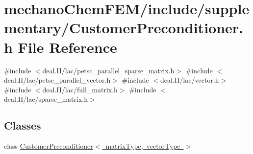 \section{mechano\+Chem\+F\+E\+M/include/supplementary/\+Customer\+Preconditioner.h File Reference}
\label{_customer_preconditioner_8h}
{\ttfamily \#include $<$deal.\+I\+I/lac/petsc\+\_\+parallel\+\_\+sparse\+\_\+matrix.\+h$>$}\newline
{\ttfamily \#include $<$deal.\+I\+I/lac/petsc\+\_\+parallel\+\_\+vector.\+h$>$}\newline
{\ttfamily \#include $<$deal.\+I\+I/lac/vector.\+h$>$}\newline
{\ttfamily \#include $<$deal.\+I\+I/lac/full\+\_\+matrix.\+h$>$}\newline
{\ttfamily \#include $<$deal.\+I\+I/lac/sparse\+\_\+matrix.\+h$>$}\newline
\subsection*{Classes}
\begin{DoxyCompactItemize}
\item 
class \mbox{\hyperlink{class_customer_preconditioner}{Customer\+Preconditioner$<$ matrix\+Type, vector\+Type $>$}}
\end{DoxyCompactItemize}
